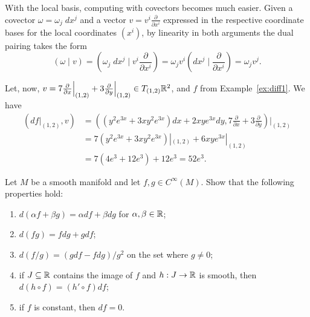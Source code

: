 With the local basis, computing with covectors becomes much easier.
Given a covector $\omega = \omega_j\; dx^j$ and a vector $v = v^i \frac{\partial}{\partial x^i}$ expressed in the respective coordinate bases for the local coordinates $(x^i)$, by linearity in both arguments the dual pairing takes the form
\begin{equation}\label{eq:localdualpairing}
	(\omega \mid v) =
	\left(\omega_j\; dx^j \;\Big |\; v^i \frac{\partial}{\partial x^i} \right) =
	\omega_j v^i \left(dx^j \;\Big |\; \frac{\partial}{\partial x^i} \right) =
	\omega_j v^j.
\end{equation}

\begin{example}
	Let, now, $v = 7 \frac{\partial}{\partial x}\Big|_{(1,2)} + 3 \frac{\partial}{\partial y}\Big|_{(1,2)}\in T_{(1,2)}\mathbb{R}^2$, and $f$ from Example~\ref{ex:diff1}.
	We have
	\begin{align}
		(df|_{(1,2)}, v)
		 & = \left((y^2 e^{3x} +3xy^2 e^{3x}) dx + 2xy e^{3x} dy, 7 \frac{\partial}{\partial x} + 3 \frac{\partial}{\partial y} \right)\Big|_{(1,2)} \\
		 & = 7(y^2 e^{3x} +3xy^2 e^{3x})|_{(1,2)} + 6 xy e^{3x}|_{(1,2)}                                                                             \\
		 & = 7(4 e^3 + 12 e^3) + 12 e^3 = 52e^3.
	\end{align}
\end{example}

\begin{exercise}
	Let $M$ be a smooth manifold and let $f,g\in C^\infty(M)$. Show that the following properties hold:
	\begin{enumerate}
		\item $d(\alpha f + \beta g) = \alpha df + \beta dg$ for $\alpha,\beta\in\mathbb{R}$;
		\item $d(fg) = f dg + g df$;
		\item $d(f/g) = (g df - f dg)/g^2$ on the set where $g\neq 0$;
		\item if $J\subseteq\mathbb{R}$ contains the image of $f$ and $h:J\to\mathbb{R}$ is smooth, then $d(h\circ f) = (h'\circ f) df$;
		\item if $f$ is constant, then $df= 0$.
	\end{enumerate}
\end{exercise}

